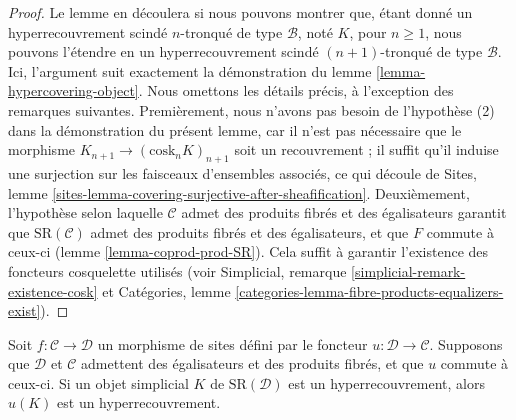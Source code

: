 \begin{proof}
\medskip\noindent
Le lemme en découlera si nous pouvons montrer que, étant donné un
hyperrecouvrement scindé $n$-tronqué de type $\mathcal{B}$, noté $K$, pour $n \geq 1$,
nous pouvons l'étendre en un hyperrecouvrement scindé $(n + 1)$-tronqué de type $\mathcal{B}$.
Ici, l'argument suit exactement la démonstration du
lemme \ref{lemma-hypercovering-object}.
Nous omettons les détails précis, à l'exception des remarques suivantes.
Premièrement, nous n'avons pas besoin de l'hypothèse (2) dans la démonstration du présent
lemme, car il n'est pas nécessaire que le morphisme
$K_{n + 1} \to (\text{cosk}_n K)_{n + 1}$ soit un recouvrement ;
il suffit qu'il induise une surjection sur les faisceaux d'ensembles associés,
ce qui découle de
Sites, lemme \ref{sites-lemma-covering-surjective-after-sheafification}.
Deuxièmement, l'hypothèse selon laquelle $\mathcal{C}$ admet des produits fibrés et des égalisateurs
garantit que $\text{SR}(\mathcal{C})$ admet des produits fibrés
et des égalisateurs, et que $F$ commute à ceux-ci
(lemme \ref{lemma-coprod-prod-SR}). Cela suffit à
garantir l'existence des foncteurs cosquelette utilisés (voir
Simplicial, remarque \ref{simplicial-remark-existence-cosk} et
Catégories, lemme \ref{categories-lemma-fibre-products-equalizers-exist}).
\end{proof}

\begin{lemma}
\label{lemma-hypercovering-morphism-sites}
Soit $f : \mathcal{C} \to \mathcal{D}$ un morphisme de sites
défini par le foncteur $u : \mathcal{D} \to \mathcal{C}$.
Supposons que $\mathcal{D}$ et $\mathcal{C}$ admettent des égalisateurs et
des produits fibrés, et que $u$ commute à ceux-ci.
Si un objet simplicial $K$ de $\text{SR}(\mathcal{D})$
est un hyperrecouvrement, alors $u(K)$ est un hyperrecouvrement.
\end{lemma}

